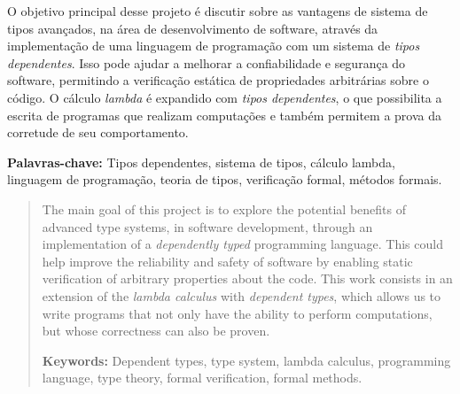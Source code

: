 \documentclass[
       embeddedlogo,
       english,
       lmodern,
       coorientadorbanca,
       noabntexcite
]{ufsc-thesis-rn46-2019}
\begin{document}

\pretextual%
\imprimircapa%
\imprimirfolhaderosto*
\protect{}
\imprimirfolhadecertificacao

\begin{resumo}[Resumo]
       O objetivo principal desse projeto é discutir sobre as vantagens de sistema de tipos avançados, na área de desenvolvimento de software, através da implementação de uma linguagem de programação com um sistema de \emph{tipos dependentes}.
       Isso pode ajudar a melhorar a confiabilidade e segurança do software, permitindo a verificação estática de propriedades arbitrárias sobre o código.
       O cálculo \emph{lambda} é expandido com \emph{tipos dependentes}, o que possibilita a escrita de programas que realizam computações e também permitem a prova da corretude de seu comportamento.

       \vspace{\baselineskip}
       \textbf{Palavras-chave:} Tipos dependentes, sistema de tipos, cálculo lambda, linguagem de programação, teoria de tipos, verificação formal, métodos formais.
\end{resumo}

\begin{abstract}
       The main goal of this project is to explore the potential benefits of advanced type systems, in software development, through an implementation of a \emph{dependently typed} programming language.
       This could help improve the reliability and safety of software by enabling static verification of arbitrary properties about the code.
       This work consists in an extension of the \emph{lambda calculus} with \emph{dependent types}, which allows us to write programs that not only have the ability to perform computations, but whose correctness can also be proven.

       \vspace{\baselineskip}
       \textbf{Keywords:} Dependent types, type system, lambda calculus, programming language, type theory, formal verification, formal methods.
\end{abstract}
\end{document}
